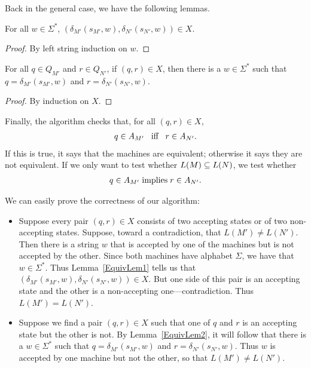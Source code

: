 Back in the general case, we have the following lemmas.

\begin{lemma}
\label{EquivLem1}
For all $w\in\Sigma^*$, $(\delta_{M'}(s_{M'},w),\delta_{N'}(s_{N'},w))\in X$.
\end{lemma}

\begin{proof}
By left string induction on $w$.
\end{proof}

\begin{lemma}
\label{EquivLem2}
For all $q\in Q_{M'}$ and $r\in Q_{N'}$, if $(q,r)\in X$, then there
is a $w\in\Sigma^*$ such that $q=\delta_{M'}(s_{M'},w)$ and
$r=\delta_{N'}(s_{N'},w)$.
\end{lemma}

\begin{proof}
By induction on $X$.
\end{proof}

Finally, the algorithm checks that, for all $(q,r)\in X$,
\begin{gather*}
q\in A_{M'}\mathrel{\;\;\allowbreak\mbox{iff}\allowbreak\;\;} r\in A_{N'} .
\end{gather*}
If this is true, it says that the machines are equivalent; otherwise
it says they are not equivalent.  If we only want to test whether
$L(M)\subseteq L(N)$, we test whether
\begin{gather*}
q\in A_{M'} \mathrel{\allowbreak\mbox{implies}\allowbreak} r\in A_{N'} .
\end{gather*}

We can easily prove the correctness of our algorithm:
\begin{itemize}
\item Suppose every pair $(q,r)\in X$ consists of two accepting states
  or of two non-accepting states.  Suppose, toward a contradiction,
  that $L(M')\neq L(N')$.  Then there is a string $w$ that is accepted
  by one of the machines but is not accepted by the other.  Since both
  machines have alphabet $\Sigma$, we have that $w\in\Sigma^*$.  Thus
  Lemma~\ref{EquivLem1} tells us that
  $(\delta_{M'}(s_{M'},w),\delta_{N'}(s_{N'},w))\in X$.  But one side
  of this pair is an accepting state and the other is a non-accepting
  one---contradiction.  Thus $L(M')=L(N')$.

\item Suppose we find a pair $(q,r)\in X$ such that one of $q$ and $r$
  is an accepting state but the other is not.  By
  Lemma~\ref{EquivLem2}, it will follow that there is a $w\in\Sigma^*$
  such that $q=\delta_{M'}(s_{M'},w)$ and $r=\delta_{N'}(s_{N'},w)$.
  Thus $w$ is accepted by one machine but not the other, so that
  $L(M')\neq L(N')$.
\end{itemize}

